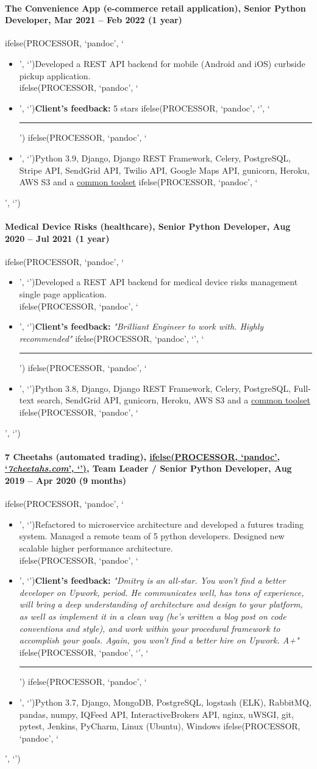 \documentclass[a4paper,8pt]{extarticle}
\newcommand{\chref}[2]{\href{#1}
{ifelse(PROCESSOR, `pandoc', `#2', `\underline{\smash{#2}}')}}
\newcommand{\itchref}[2]{\chref{#1}{\textit{#2}}}  %
\newcommand{\chrule}{ifelse(PROCESSOR, `pandoc', `', `\vspace{3pt}\hrule')}
\newcommand{\pdbeginitemize}{ifelse(PROCESSOR, `pandoc', `\begin{itemize}', `')}
\newcommand{\pditem}{ifelse(PROCESSOR, `pandoc', `\item', `')}
\newcommand{\pdenditemize}{ifelse(PROCESSOR, `pandoc', `\end{itemize}', `')}
\begin{document}
\paragraph*{The Convenience App (e-commerce retail application), Senior Python Developer, Mar 2021 -- Feb 2022 (1 year)}
\pdbeginitemize
\pditem Developed a REST API backend for mobile (Android and iOS) curbside pickup application.\\
\pditem \textbf{Client's feedback:} 5 stars
\chrule
\pditem Python 3.9, Django, Django REST Framework, Celery, PostgreSQL, Stripe API, SendGrid API, Twilio API, Google Maps API, gunicorn, Heroku, AWS S3 and a \hyperlink{common-toolset}{common toolset}
\pdenditemize

\paragraph*{Medical Device Risks (healthcare), Senior Python Developer, Aug 2020 -- Jul 2021 (1 year)}
\pdbeginitemize
\pditem Developed a REST API backend for medical device risks management single page application.\\
\pditem \textbf{Client's feedback:} \textit{"Brilliant Engineer to work with. Highly recommended"}
\chrule
\pditem Python 3.8, Django, Django REST Framework, Celery, PostgreSQL, Full-text search, SendGrid API, gunicorn, Heroku, AWS S3 and a \hyperlink{common-toolset}{common toolset}
\pdenditemize

\pagebreak

\paragraph*{7 Cheetahs (automated trading), \itchref{https://7cheetahs.com}{7cheetahs.com}, Team Leader / Senior Python Developer, Aug 2019 -- Apr 2020 (9 months)}
\pdbeginitemize
\pditem Refactored to microservice architecture and developed a futures trading system. Managed a remote team of 5 python developers. Designed new scalable higher performance architecture.\\
\pditem \textbf{Client's feedback:} \textit{"Dmitry is an all-star. You won't find a better developer on Upwork, period. He communicates well, has tons of experience, will bring a deep understanding of architecture and design to your platform, as well as implement it in a clean way (he's written a blog post on code conventions and style), and work within your procedural framework to accomplish your goals. Again, you won't find a better hire on Upwork. A+"}
\chrule
\pditem Python 3.7, Django, MongoDB, PostgreSQL, logstash (ELK), RabbitMQ, pandas, numpy, IQFeed API, InteractiveBrokers API, nginx, uWSGI, git, pytest, Jenkins, PyCharm, Linux (Ubuntu), Windows
\pdenditemize
\end{document}

